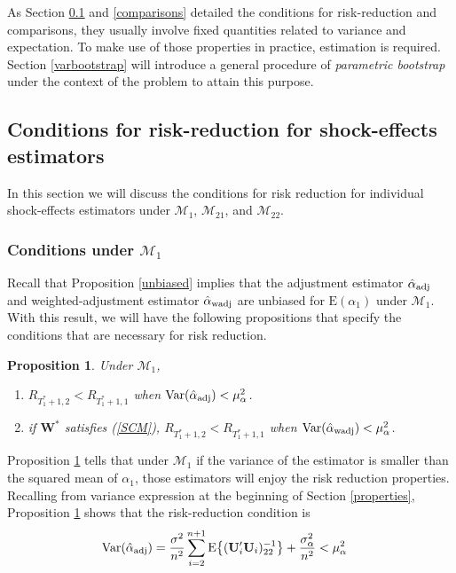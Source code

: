 \documentclass[11pt]{article}
\def\mbf#1{\mathbf{#1}} %
\def\mrm#1{\mathrm{#1}} %
\def\mc#1{\mathcal{#1}} %
\def\E#1{\mathrm{E}(#1)} %
\def\var#1{\mathrm{Var}(#1)} %
\DeclareMathOperator{\Var}{Var} %
\newtheorem{prop}{Proposition}
\theoremstyle{definition}
\begin{document}
As Section \ref{conditions} and \ref{comparisons} detailed the conditions for risk-reduction and comparisons, they usually involve fixed quantities related to variance and expectation. To make use of those properties in practice, estimation is required. Section \ref{varbootstrap} will introduce a general procedure of \emph{parametric bootstrap} under the context of the problem to attain this purpose.


\subsection{Conditions for risk-reduction for shock-effects estimators}
\label{conditions}

In this section we will discuss the conditions for risk reduction for individual shock-effects estimators under $\mc{M}_1$, $\mc{M}_{21}$, and $\mc{M}_{22}$. %

\subsubsection{Conditions under $\mc{M}_1$}
 \label{conditionsmodel1}
 
Recall that Proposition \ref{unbiased} implies that the adjustment estimator $\hat{\alpha}_{\rm adj}$ and weighted-adjustment estimator $\hat{\alpha}_{\rm wadj}$ are unbiased for $\E{\alpha_1}$ under $\mc{M}_1$. With this result, we will have  the following propositions that specify the conditions that are necessary for risk reduction. 

\begin{prop}
\label{proprisk}Under $\mc{M}_1$,
\begin{enumerate}[label = (\roman*)]
  \item  $R_{T_1^*+1, 2} < R_{T_1^*+1, 1}$ when 
$\Var(\hat{\alpha}_{\rm adj}) < \mu_{\alpha}^2$.
  \item if $\mbf{W}^*$ satisfies (\ref{SCM}), $R_{T_1^*+1,2}<R_{T_1^*+1,1}$ when $\var{\hat{\alpha}_{\rm wadj}}<\mu_{\alpha}^2$. 
\end{enumerate}
\end{prop}

Proposition \ref{proprisk} tells that under $\mc{M}_1$ if the variance of the estimator is smaller than the squared mean of $\alpha_1$, those estimators will enjoy the risk reduction properties. Recalling from variance expression at the beginning of Section \ref{properties}, Proposition \ref{proprisk} shows that the risk-reduction condition is
\begin{align}
  \var{\hat{\alpha}_{\rm adj}} 
  &=\frac{\sigma^2}{n^2}\sum_{i=2}^{n+1}\mrm{E}\big\{(\mbf{U}'_i\mbf{U}_i)^{-1}_{22}\big\}+\frac{\sigma^2_{\alpha}}{n^2} < \mu_{\alpha}^2 \label{riskconditionadj}
\end{align}
\end{document}

